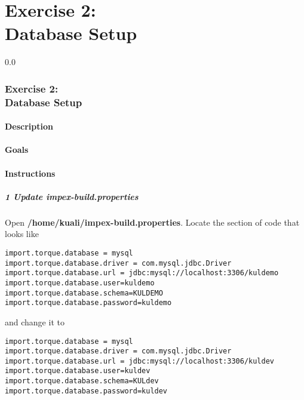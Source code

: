 \part*{Exercise 2: \\
Database Setup}

{\setlength{\baselineskip}%
  {0.0\baselineskip}
  \section*{\flushright Exercise 2: \\
Database Setup}
  \hrulefill \par}

\subsection*{Description}

\subsection*{Goals}

\subsection*{Instructions}
\subsubsection{1 Update impex-build.properties}
Open \textbf{/home/kuali/impex-build.properties}. Locate the section of code that looks like
\begin{verbatim}
import.torque.database = mysql
import.torque.database.driver = com.mysql.jdbc.Driver
import.torque.database.url = jdbc:mysql://localhost:3306/kuldemo
import.torque.database.user=kuldemo
import.torque.database.schema=KULDEMO
import.torque.database.password=kuldemo
\end{verbatim}

and change it to

\begin{verbatim}
import.torque.database = mysql
import.torque.database.driver = com.mysql.jdbc.Driver
import.torque.database.url = jdbc:mysql://localhost:3306/kuldev
import.torque.database.user=kuldev
import.torque.database.schema=KULdev
import.torque.database.password=kuldev
\end{verbatim}

